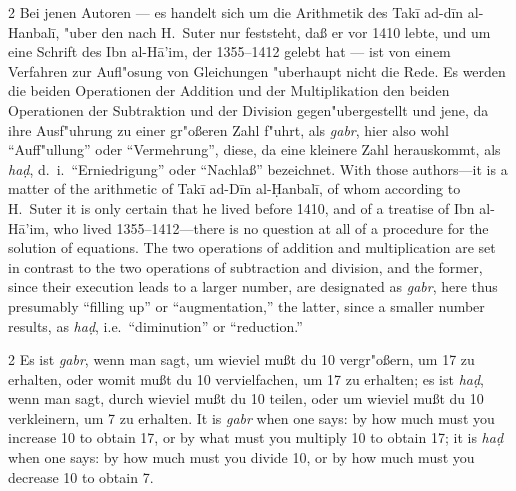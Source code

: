 \documentclass[10pt,a4paper]{article}
\renewcommand{\switchcolumn}{\syncronize\nointerlineskip\columnbreak}
\newcommand{\enquote}[1]{``#1''}
\begin{document}
\begin{paracol}{2}
Bei jenen Autoren --- es handelt sich um die Arithmetik des Tak\=i{} ad-d\={i}n al-Hanbal\=i, "uber den nach H.\ Suter nur feststeht, da\ss{} er vor 1410 lebte, und um eine Schrift des Ibn al-H\=a'im, der 1355--1412 gelebt hat --- ist von einem Verfahren zur Aufl"osung von Gleichungen "uberhaupt nicht die Rede. Es werden die beiden Operationen der Addition und der Multiplikation den beiden Operationen der Subtraktion und der Division gegen"ubergestellt und jene, da ihre Ausf"uhrung zu einer gr"o\ss{}eren Zahl f"uhrt, als \textit{gabr}, hier also wohl \enquote{Auff"ullung} oder \enquote{Vermehrung}, diese, da eine kleinere Zahl herauskommt, als \textit{ha\d{d}}, d.\ i.\ \enquote{Erniedrigung} oder \enquote{Nachla\ss{}} bezeichnet.
\switchcolumn
With those authors---it is a matter of the arithmetic of Tak\={i} ad-D\={i}n al-\d{H}anbal\={i}, of whom according to H.\ Suter it is only certain that he lived before 1410, and of a treatise of Ibn al-H\=a'im, who lived 1355--1412---there is no question at all of a procedure for the solution of equations. The two operations of addition and multiplication are set in contrast to the two operations of subtraction and division, and the former, since their execution leads to a larger number, are designated as \textit{gabr}, here thus presumably ``filling up'' or ``augmentation,'' the latter, since a smaller number results, as \textit{ha\d{d}}, i.e.\ ``diminution'' or ``reduction.''
\end{paracol}

\begin{paracol}{2}
Es ist \textit{gabr}, wenn man sagt, um wieviel mu\ss{}t du 10 vergr"o\ss{}ern, um 17 zu erhalten, oder womit mu\ss{}t du 10 vervielfachen, um 17 zu erhalten; es ist \textit{ha\d{d}}, wenn man sagt, durch wieviel mu\ss{}t du 10 teilen, oder um wieviel mu\ss{}t du 10 verkleinern, um 7 zu erhalten.
\switchcolumn
It is \textit{gabr} when one says: by how much must you increase 10 to obtain 17, or by what must you multiply 10 to obtain 17; it is \textit{ha\d{d}} when one says: by how much must you divide 10, or by how much must you decrease 10 to obtain 7.
\end{paracol}
\end{document}
